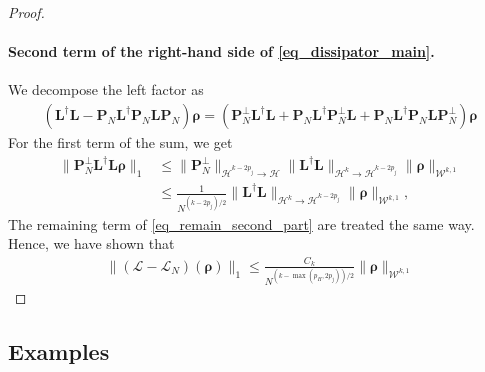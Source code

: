 \documentclass{article}
\newcommand{\xL}{\mathcal{L}}
\newcommand{\xH}{\mathcal{H}}
\newcommand{\xW}{\mathcal{W}}
\let\bf\boldsymbol
\newcommand{\orho}{{\bf \rho}}
\newcommand{\oL}{{\bf L}}
\newcommand{\oP}{{\bf P}}
\begin{document}
\begin{proof}
    \paragraph{Second term of the right-hand side of \cref{eq_dissipator_main}.}
    We decompose the left factor as
    \begin{align}
        \label{eq_remain_second_part}
        (\oL^\dag \oL - \oP_N \oL^\dag \oP_N \oL \oP_N)\orho= (\oP_N^\perp \oL^\dag \oL + \oP_N \oL^\dag \oP_N^\perp \oL+ \oP_N \oL^\dag \oP_N \oL \oP_N^\perp)\orho
    \end{align}
    For the first term of the sum, we get
    \begin{align}
        \|\oP_N^\perp \oL^\dag \oL \orho \|_1&\leq \|\oP_N^\perp\|_{\xH^{k-2p_j}\to \xH} \| \oL^\dag \oL\|_{\xH^{k}\to \xH^{k-2p_j}} \|\orho\|_{\xW^{k,1}}\\
        &\leq \frac{1}{N^{(k-2p_j)/2}}\| \oL^\dag \oL\|_{\xH^{k}\to \xH^{k-2p_j}} \|\orho\|_{\xW^{k,1}},
    \end{align}
    The remaining term of \cref{eq_remain_second_part} are treated the same way.
    Hence, we have shown that
    \begin{align}
        \| (\xL-\xL_N)(\orho)\|_1\leq \frac{C_k}{N^{(k-\max (p_H,2p_j))/2}} \|\orho\|_{\xW^{k,1}}
    \end{align}
\end{proof}

\subsection{Examples}
\label{ex_1mode}
\end{document}

